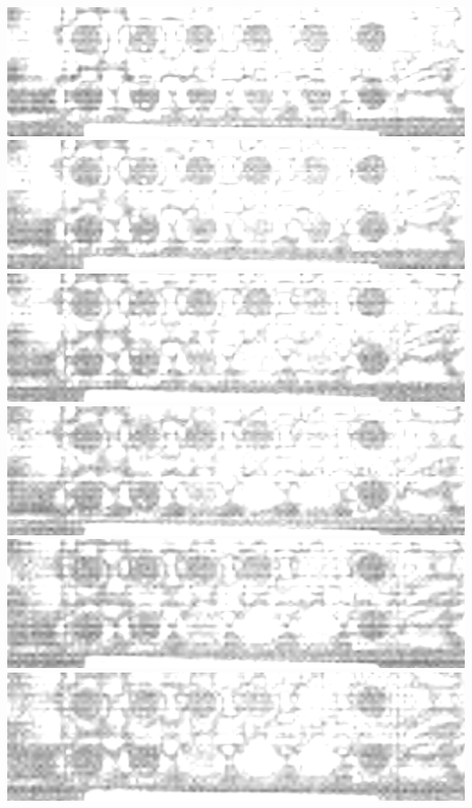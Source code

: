 \documentclass{beamer}
\begin{document}
\begin{frame}
        \includegraphics[height=0.023\textheight]{spatial-denoised/wavelet_den_7.png}
        \includegraphics[height=0.023\textheight]{spatial-denoised/wavelet_den_8.png}
        \includegraphics[height=0.023\textheight]{spatial-denoised/wavelet_den_9.png}
        \includegraphics[height=0.023\textheight]{spatial-denoised/wavelet_den_10.png}
        \includegraphics[height=0.023\textheight]{spatial-denoised/wavelet_den_11.png}
        \includegraphics[height=0.023\textheight]{spatial-denoised/wavelet_den_12.png}

\end{frame}
\end{document}
